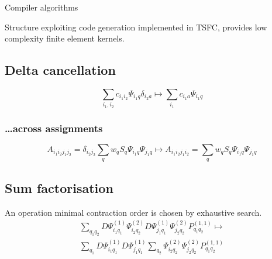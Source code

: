 \documentclass[cmyk,luatex,a0paper,portrait]{baposter}
\begin{document}
\begin{poster}
  \begin{posterbox}[name=rules, column=0, below=structure, span=3,
    height=0.275]{Compiler algorithms}
    \raggedright
    Structure exploiting code generation implemented in TSFC,
    provides low complexity finite element kernels.
    \vspace{-\baselineskip}
    \subsection*{Delta cancellation}
    \vspace{-0.35\baselineskip}
    \begin{equation*}
      \sum_{i_1, i_2} c_{i_1 i_2} \Psi_{i_1 q}
      \delta_{i_2 a} \mapsto \sum_{i_1} c_{i_1 a}\Psi_{i_1 q}
    \end{equation*}
    \vspace{-2\baselineskip}
    \subsubsection*{\dots across assignments}
    \vspace{-0.35\baselineskip}
    \begin{equation*}
      A_{i_1 i_2 j_1 j_2} = \delta_{i_2 j_2} \sum_q w_q S_q \Psi_{i_1 q}\Psi_{j_1 q} \mapsto A_{i_1 i_2 j_1 i_2} = \sum_q w_q S_q \Psi_{i_1 q}\Psi_{j_1 q}
    \end{equation*}
    \vspace{-1.75\baselineskip}
    \subsection*{Sum factorisation}
    \vspace{-0.35\baselineskip}
    An operation minimal contraction order is chosen by exhaustive search.
    \begin{align*}
      \sum_{q_1 q_2} D\Psi^{(1)}_{i_1 q_1}\Psi^{(2)}_{i_2 q_2}
      D\Psi^{(1)}_{j_1 q_1}\Psi^{(2)}_{j_2 q_2} P^{(1,1)}_{q_1 q_2}
      \mapsto \\
      \sum_{q_1} D\Psi^{(1)}_{i_1 q_1} D\Psi^{(1)}_{j_1 q_1} \sum_{q_2}  \Psi^{(2)}_{i_2 q_2}\Psi^{(2)}_{j_2 q_2} P^{(1,1)}_{q_1 q_2}
    \end{align*}
  \end{posterbox}


\end{poster}
\end{document}
